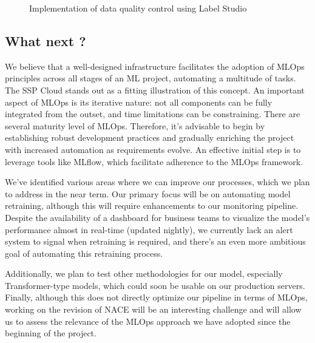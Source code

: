 \begin{figure}[htbp]
    \centering
    \caption{Implementation of data quality control using Label Studio}
    \label{fig:annotation-datalab}
\end{figure}

\subsection{What next ?}

We believe that a well-designed infrastructure facilitates the adoption of MLOps principles across all stages of an ML project, automating a multitude of tasks. The SSP Cloud stands out as a fitting illustration of this concept.
An important aspect of MLOps is its iterative nature: not all components can be fully integrated from the outset, and time limitations can be constraining. There are several maturity level of MLOps. Therefore, it's advisable to begin by establishing robust development practices and gradually enriching the project with increased automation as requirements evolve. An effective initial step is to leverage tools like MLflow, which facilitate adherence to the MLOps framework.

We've identified various areas where we can improve our processes, which we plan to address in the near term. Our primary focus will be on automating model retraining, although this will require enhancements to our monitoring pipeline. Despite the availability of a dashboard for business teams to visualize the model's performance almost in real-time (updated nightly), we currently lack an alert system to signal when retraining is required, and there's an even more ambitious goal of automating this retraining process.

Additionally, we plan to test other methodologies for our model, especially Transformer-type models, which could soon be usable on our production servers. Finally, although this does not directly optimize our pipeline in terms of MLOps, working on the revision of NACE will be an interesting challenge and will allow us to assess the relevance of the MLOps approach we have adopted since the beginning of the project.

